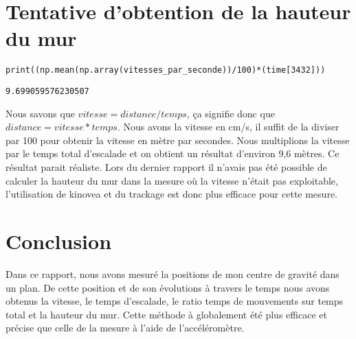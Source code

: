 \documentclass[11pt]{article}
\begin{document}
\section{Tentative d'obtention de la hauteur du mur}
\label{sec:org3a69589}

\begin{verbatim}
print((np.mean(np.array(vitesses_par_seconde))/100)*(time[3432]))
\end{verbatim}

\label{org86c0126}
\begin{verbatim}
9.699059576230507
\end{verbatim}


Nous savons que \(vitesse = distance/temps\), ça signifie donc que \(distance = vitesse*temps\). Nous avons la vitesse en cm/s, il suffit de la diviser
par 100 pour obtenir la vitesse en mètre par secondes. Nous multiplions la vitesse par le temps total d'escalade et on obtient un résultat d'environ
9,6 mètres. Ce résultat parait réaliste. Lors du dernier rapport il n'avais pas été possible de calculer la hauteur du mur dans la mesure où la
vitesse n'était pas exploitable, l'utilisation de kinovea et du trackage est donc plus efficace pour cette mesure.
\section{Conclusion}
\label{sec:org9b627ec}

Dans ce rapport, nous avons mesuré la positions de mon centre de gravité dans un plan. De cette position et de son évolutions à travers le temps nous
avons obtenus la vitesse, le temps d'escalade, le ratio temps de mouvements sur temps total et la hauteur du mur. Cette méthode à globalement été plus
efficace et précise que celle de la mesure à l'aide de l'accéléromètre.
\end{document}
